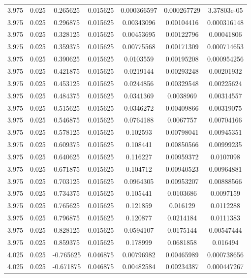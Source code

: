 \begin{table}[bh]
\begin{center}
{\begin{tabular}{ccccccc}
3.975	 & 0.025 & 	0.265625	 & 0.015625	 & 0.000366597	 & 0.000267729	 & 3.37803e-05 \\ 
3.975	 & 0.025 & 	0.296875	 & 0.015625	 & 0.00343096	 & 0.00104416	 & 0.000316148 \\ 
3.975	 & 0.025 & 	0.328125	 & 0.015625	 & 0.00453695	 & 0.00122796	 & 0.00041806 \\ 
3.975	 & 0.025 & 	0.359375	 & 0.015625	 & 0.00775568	 & 0.00171309	 & 0.000714653 \\ 
3.975	 & 0.025 & 	0.390625	 & 0.015625	 & 0.0103559	 & 0.00195208	 & 0.000954256 \\ 
3.975	 & 0.025 & 	0.421875	 & 0.015625	 & 0.0219144	 & 0.00293248	 & 0.00201932 \\ 
3.975	 & 0.025 & 	0.453125	 & 0.015625	 & 0.0244856	 & 0.00329548	 & 0.00225624 \\ 
3.975	 & 0.025 & 	0.484375	 & 0.015625	 & 0.0341369	 & 0.0038969	 & 0.00314557 \\ 
3.975	 & 0.025 & 	0.515625	 & 0.015625	 & 0.0346272	 & 0.00409866	 & 0.00319075 \\ 
3.975	 & 0.025 & 	0.546875	 & 0.015625	 & 0.0764188	 & 0.0067757	 & 0.00704166 \\ 
3.975	 & 0.025 & 	0.578125	 & 0.015625	 & 0.102593	 & 0.00798041	 & 0.00945351 \\ 
3.975	 & 0.025 & 	0.609375	 & 0.015625	 & 0.108441	 & 0.00850566	 & 0.00999235 \\ 
3.975	 & 0.025 & 	0.640625	 & 0.015625	 & 0.116227	 & 0.00959372	 & 0.0107098 \\ 
3.975	 & 0.025 & 	0.671875	 & 0.015625	 & 0.104712	 & 0.00940523	 & 0.00964881 \\ 
3.975	 & 0.025 & 	0.703125	 & 0.015625	 & 0.0964305	 & 0.00953207	 & 0.00888566 \\ 
3.975	 & 0.025 & 	0.734375	 & 0.015625	 & 0.105441	 & 0.0103686	 & 0.0097159 \\ 
3.975	 & 0.025 & 	0.765625	 & 0.015625	 & 0.121859	 & 0.016129	 & 0.0112288 \\ 
3.975	 & 0.025 & 	0.796875	 & 0.015625	 & 0.120877	 & 0.0214184	 & 0.0111383 \\ 
3.975	 & 0.025 & 	0.828125	 & 0.015625	 & 0.0594107	 & 0.0175144	 & 0.00547444 \\ 
3.975	 & 0.025 & 	0.859375	 & 0.015625	 & 0.178999	 & 0.0681858	 & 0.016494 \\ 
4.025	 & 0.025 & 	-0.765625	 & 0.046875	 & 0.00796982	 & 0.00465989	 & 0.000738656 \\ 
4.025	 & 0.025 & 	-0.671875	 & 0.046875	 & 0.00482584	 & 0.00234387	 & 0.000447267 \\ 

\end{tabular}}
\end{center}
\end{table}

